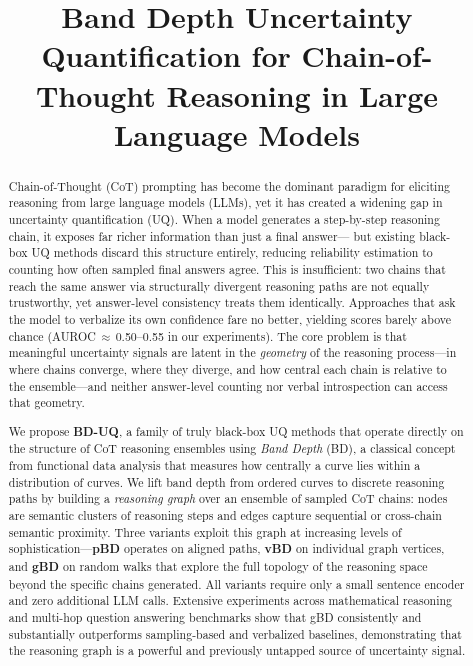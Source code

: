 \documentclass[11pt]{article}
\title{Band Depth Uncertainty Quantification for Chain-of-Thought Reasoning in Large Language Models}
\author{}
\date{}
\begin{document}
\maketitle

\begin{abstract}
Chain-of-Thought (CoT) prompting has become the dominant paradigm for eliciting
reasoning from large language models (LLMs), yet it has created a widening gap
in uncertainty quantification (UQ). When a model generates a step-by-step
reasoning chain, it exposes far richer information than just a final answer---
but existing black-box UQ methods discard this structure entirely, reducing
reliability estimation to counting how often sampled final answers agree.
This is insufficient: two chains that reach the same answer via structurally
divergent reasoning paths are not equally trustworthy, yet answer-level
consistency treats them identically. Approaches that ask the model to verbalize
its own confidence fare no better, yielding scores barely above chance
(AUROC\,$\approx$\,0.50--0.55 in our experiments). The core problem is that
meaningful uncertainty signals are latent in the \emph{geometry} of the
reasoning process---in where chains converge, where they diverge, and how
central each chain is relative to the ensemble---and neither answer-level
counting nor verbal introspection can access that geometry.

We propose \textbf{BD-UQ}, a family of truly black-box UQ methods that operate
directly on the structure of CoT reasoning ensembles using \emph{Band Depth}
(BD), a classical concept from functional data analysis that measures how
centrally a curve lies within a distribution of curves. We lift band depth from
ordered curves to discrete reasoning paths by building a \emph{reasoning graph}
over an ensemble of sampled CoT chains: nodes are semantic clusters of reasoning
steps and edges capture sequential or cross-chain semantic proximity. Three
variants exploit this graph at increasing levels of sophistication---\textbf{pBD}
operates on aligned paths, \textbf{vBD} on individual graph vertices, and
\textbf{gBD} on random walks that explore the full topology of the reasoning
space beyond the specific chains generated. All variants require only a small
sentence encoder and zero additional LLM calls. Extensive experiments across
mathematical reasoning and multi-hop question answering benchmarks show that
gBD consistently and substantially outperforms sampling-based and verbalized
baselines, demonstrating that the reasoning graph is a powerful and previously
untapped source of uncertainty signal.
\end{abstract}
\end{document}
